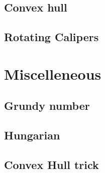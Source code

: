 \documentclass[10pt,landscape,a4paper,twocolumn]{article}
\begin{document}
\subsection{Convex hull}


\subsection{Rotating Calipers}



\section{Miscelleneous}
\subsection{Grundy number}


\subsection{Hungarian}


\subsection{Convex Hull trick}

\end{document}
